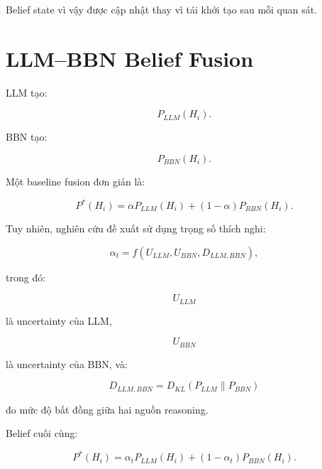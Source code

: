 \documentclass[11pt,a4paper]{article}
\begin{document}
	Belief state vì vậy được cập nhật thay vì tái khởi tạo sau mỗi quan sát.
	
	\section{LLM--BBN Belief Fusion}
	
	LLM tạo:
	
	\begin{equation}
		P_{LLM}(H_i).
	\end{equation}
	
	BBN tạo:
	
	\begin{equation}
		P_{BBN}(H_i).
	\end{equation}
	
	Một baseline fusion đơn giản là:
	
	\begin{equation}
		P^*(H_i)
		=
		\alpha
		P_{LLM}(H_i)
		+
		(1-\alpha)
		P_{BBN}(H_i).
	\end{equation}
	
	Tuy nhiên, nghiên cứu đề xuất sử dụng trọng số thích nghi:
	
	\begin{equation}
		\alpha_t
		=
		f
		\left(
		U_{LLM},
		U_{BBN},
		D_{LLM,BBN}
		\right),
	\end{equation}
	
	trong đó:
	
	\begin{equation}
		U_{LLM}
	\end{equation}
	
	là uncertainty của LLM,
	
	\begin{equation}
		U_{BBN}
	\end{equation}
	
	là uncertainty của BBN, và:
	
	\begin{equation}
		D_{LLM,BBN}
		=
		D_{KL}
		\left(
		P_{LLM}
		\|
		P_{BBN}
		\right)
	\end{equation}
	
	đo mức độ bất đồng giữa hai nguồn reasoning.
	
	Belief cuối cùng:
	
	\begin{equation}
		P^*(H_i)
		=
		\alpha_tP_{LLM}(H_i)
		+
		(1-\alpha_t)P_{BBN}(H_i).
	\end{equation}
	
\end{document}
